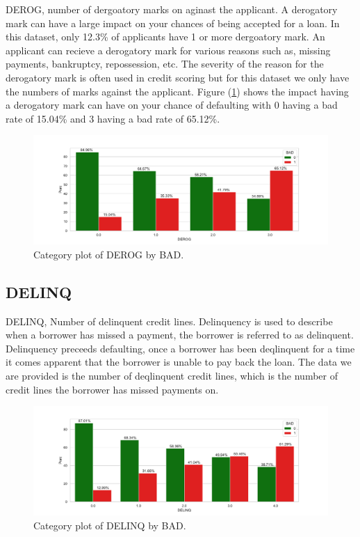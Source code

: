 DEROG,  number of dergoatory marks on aginast the applicant. A derogatory mark can have a large impact on your chances of being accepted for a loan. In this dataset,  only 12.3\% of applicants have 1 or more dergoatory mark. An applicant can recieve a derogatory mark for various reasons such as,  missing payments,  bankruptcy,  repossession,  etc. The severity of the reason for the derogatory mark is often used in credit scoring but for this dataset we only have the numbers of marks against the applicant. Figure (\ref{derog_cat}) shows the impact having a derogatory mark can have on your chance of defaulting with 0 having a bad rate of 15.04\% and 3 having a bad rate of 65.12\%.

\begin{figure}[H]
	\centering
	\includegraphics[scale=0.40]{figs/derog_cat.pdf}
	\caption{Category plot of DEROG by BAD. \label{derog_cat}}
\end{figure}

\subsection*{DELINQ}

DELINQ,  Number of delinquent credit lines. Delinquency is used to describe when a borrower has missed a payment,  the borrower is referred to as delinquent. Delinquency preceeds defaulting,  once a borrower has been deqlinquent for a time it comes apparent that the borrower is unable to pay back the loan. The data we are provided is the number of deqlinquent credit lines,  which is the number of credit lines the borrower has missed payments on. 

\begin{figure}[H]
	\centering
	\includegraphics[scale=0.40]{figs/delinq_cat.pdf}
	\caption{Category plot of DELINQ by BAD. \label{delinq_cat}}
\end{figure}

